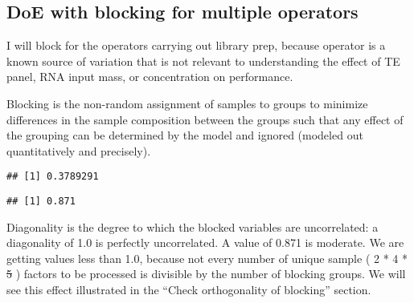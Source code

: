 \documentclass[
]{article}
\newenvironment{Shaded}{\begin{snugshade}}{\end{snugshade}}
\newcommand{\FunctionTok}[1]{\textcolor[rgb]{0.00,0.00,0.00}{#1}}
\newcommand{\NormalTok}[1]{#1}
\newcommand{\OtherTok}[1]{\textcolor[rgb]{0.56,0.35,0.01}{#1}}
\newcommand{\SpecialCharTok}[1]{\textcolor[rgb]{0.00,0.00,0.00}{#1}}
\newcommand{\StringTok}[1]{\textcolor[rgb]{0.31,0.60,0.02}{#1}}
\begin{document}
\hypertarget{doe-with-blocking-for-multiple-operators}{%
\subsection{DoE with blocking for multiple
operators}\label{doe-with-blocking-for-multiple-operators}}

I will block for the operators carrying out library prep, because
operator is a known source of variation that is not relevant to
understanding the effect of TE panel, RNA input mass, or concentration
on performance.

Blocking is the non-random assignment of samples to groups to minimize
differences in the sample composition between the groups such that any
effect of the grouping can be determined by the model and ignored
(modeled out quantitatively and precisely).

\begin{Shaded}
\end{Shaded}

\begin{verbatim}
## [1] 0.3789291
\end{verbatim}

\begin{Shaded}
\end{Shaded}

\begin{verbatim}
## [1] 0.871
\end{verbatim}

Diagonality is the degree to which the blocked variables are
uncorrelated: a diagonality of 1.0 is perfectly uncorrelated. A value of
0.871 is moderate. We are getting values less than 1.0, because not
every number of unique sample ( 2 * 4 * \sout{5} ) factors to be
processed is divisible by the number of blocking groups. We will see
this effect illustrated in the ``Check orthogonality of blocking''
section.

\begin{Shaded}
\end{Shaded}
\end{document}
